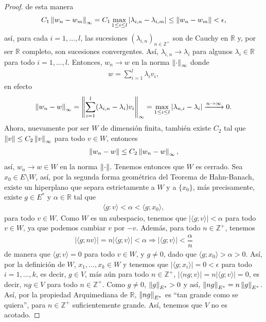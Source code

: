 \begin{proof}
    de esta manera
    \begin{align*}
        C_1\left\|w_n-w_m\right\|_\infty=C_1\max_{1\leq i\leq l}|\lambda_{i,n}-\lambda_{i,m}|\leq \left\|w_n-w_m\right\|<\epsilon,
    \end{align*}
    así, para cada $i=1,...,l$, las sucesiones $(\lambda_{i,n})_{n \in \mathbb{Z}^+}$ son de Cauchy en $\mathbb{R}$ y, por ser $\mathbb{R}$ completo, son sucesiones convergentes. Así, $\lambda_{i,n}\to \lambda_i$ para algunos $\lambda_i \in \mathbb{R}$ para todo $i=1,...,l$. Entonces, $w_n\to w$ en la norma $\left\|\cdot\right\|_\infty$ donde 
    \begin{align*}
        w=\sum_{i=1}^l \lambda_i v_i,
    \end{align*}
    en efecto
    \begin{align*}
        \left\|w_n-w\right\|_\infty=\left\|\sum_{i=1}^l (\lambda_{i,n}-\lambda_i)v_i\right\|_\infty=\max_{1\leq i \leq l}|\lambda_{n,i}-\lambda_i|\xrightarrow{n\to \infty} 0.
    \end{align*}
    Ahora, nuevamente por ser $W$ de dimensión finita, también existe $C_2$ tal que $\left\|v\right\|\leq C_2\left\|v\right\|_\infty$ para todo $v \in W$, entonces 
    \begin{align*}
        \left\|w_n-w\right\|\leq C_2\left\|w_n-w\right\|_\infty,
    \end{align*}
    así, $w_n\to w \in W$ en la norma $\left\|\cdot\right\|$. Tenemos entonces que $W$ es cerrado. Sea $x_0 \in E\setminus W$, así, por la segunda forma geométrica del Teorema de Hahn-Banach, existe un hiperplano que separa estrictamente a $W$ y a $\{x_0\}$, más precisamente, existe $g \in E^*$ y $\alpha\in \mathbb{R}$ tal que 
    \begin{align*}
        \langle g:v\rangle<\alpha<\langle g;x_0\rangle,
    \end{align*}
    para todo $v \in W$. Como $W$ es un subespacio, tenemos que $|\langle g;v\rangle|<\alpha$ para todo $v \in W$, ya que podemos cambiar $v$ por $-v$. Además, para todo $n \in \mathbb{Z}^+$, tenemos
    \begin{align*}
        |\langle g;nv\rangle|=n|\langle g;v\rangle|<\alpha \Longrightarrow |\langle g;v\rangle|<\dfrac{\alpha}{n}
    \end{align*}
    de manera que $\langle g;v\rangle=0$ para todo $v \in W$, y $g\neq 0$, dado que $\langle g;x_0\rangle>\alpha>0$. Así, por la definición de $W$, $x_1,...,x_k\in W$ y tenemos que $|\langle g;x_i\rangle|=0<\epsilon$ para todo $i=1,...,k$, es decir, $g \in V$, más aún para todo $n\in \mathbb{Z}^+$, $|\langle ng;v\rangle|=n|\langle g;v\rangle|=0$, es decir, $ng \in V$ para todo $n \in \mathbb{Z}^+$. Como $g\neq 0$, $\left\|g\right\|_{E^*}>0$ y así, $\left\|ng\right\|_{E^*}=n\left\|g\right\|_{E^*}$. Así, por la propiedad Arquimediana de $\mathbb{R}$, $\left\|ng\right\|_{E^*}$ es ``tan grande como se quiera'', para $n\in \mathbb{Z}^+$ suficientemente grande. Así, tenemos que $V$ no es acotado.
    
\end{proof}

